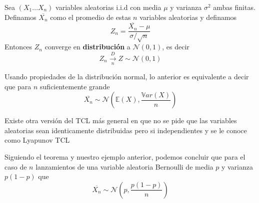 \begin{theorem}

Sea $(X_1\dots X_n)$ variables aleatorias i.i.d con media $\mu$ y varianza $\sigma^2$ ambas finitas. Definamos $\overline{X_n}$ como el promedio de estas $n$ variables aleatorias y definamos 
\[ Z_n = \frac{\overline{X_n}-\mu}{\sigma / \sqrt{n}} \]
Entonces $Z_n$ converge en \textbf{distribución} a $\mathcal{N}(0,1)$, es decir 
\[ Z_n \xrightarrow[n]{D} Z \sim \mathcal{N}(0,1) \]


\end{theorem}

\begin{remark}
Usando propiedades de la distribución normal, lo anterior es equivalente a decir que para $n$ suficientemente grande
\[ \overline{X_n} \sim \mathcal{N} \left (\mathbb{E}(X),\frac{\mathbb{V}ar(X)}{n} \right) \]
\end{remark}
\begin{remark}
Existe otra versión del TCL más general en que no se pide que las variables aleatorias sean identicamente distribuidas pero si independientes y se le conoce como Lyapunov TCL
\end{remark}

\begin{example}
Siguiendo el teorema y nuestro ejemplo anterior, podemos concluir que para el caso de $n$ lanzamientos de una variable aleatoria Bernoulli de media $p$ y varianza $p(1-p)$ que 
\[ \overline{X_n} \sim \mathcal{N} \left (p,\frac{p(1-p)}{n} \right ) \]

\end{example}


